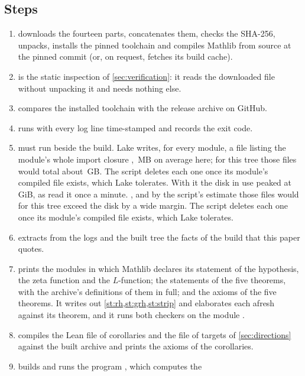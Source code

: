 \subsection*{Steps}
\begin{enumerate}
\item {} downloads the fourteen parts, concatenates them, checks the SHA-256,
  unpacks, installs the pinned toolchain and compiles Mathlib from source at the pinned commit
  (or, on request, fetches its build cache).
\item {} is the static inspection of \cref{sec:verification}: it reads the
  downloaded file without unpacking it and needs nothing else.
\item {} compares the installed toolchain with the release archive on GitHub.
\item {} runs  with every log line time-stamped and records
  the exit code.
\item {} must run beside the build. Lake writes, for every module, a file listing
  the module's whole import closure%
\ifsecondrun
, \setupfilemb{}\,MB on average here; for this tree those
  files would total about \setupallgb{}\,GB. The script deletes each one once its module's
  compiled file exists, which Lake tolerates. With it the disk in use peaked at
  \diskpeak{}\,GiB, as  read it once a minute.
\else
, and by the script's estimate those files would for this tree exceed the disk by a wide
  margin. The script deletes each
  one once its module's compiled file exists, which Lake tolerates.
\fi
\item {} extracts from the logs and the built tree the facts of the build that
  this paper quotes.
\item {} prints the modules in which Mathlib declares its statement of the
  hypothesis, the zeta function and the $L$-function; the statements of the five theorems,
  with the archive's definitions of them in full; and the axioms of the five theorems. It
  writes out \cref{st:rh,st:grh,st:strip} and elaborates each afresh against its theorem,
  and it runs both checkers on the module .
\item {} compiles the Lean file of corollaries and the file of targets of
  \cref{sec:directions} against the built archive and prints the axioms of the corollaries.
\item {} builds and runs the program , which computes the

\end{enumerate}
